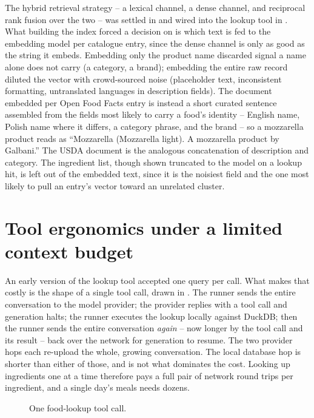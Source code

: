 The hybrid retrieval strategy -- a lexical channel, a dense channel, and reciprocal rank fusion over the two -- was settled in  and wired into the lookup tool in . What building the index forced a decision on is which text is fed to the embedding model per catalogue entry, since the dense channel is only as good as the string it embeds. Embedding only the product name discarded signal a name alone does not carry (a category, a brand); embedding the entire raw record diluted the vector with crowd-sourced noise (placeholder text, inconsistent formatting, untranslated languages in description fields). The document embedded per Open Food Facts entry is instead a short curated sentence assembled from the fields most likely to carry a food's identity -- English name, Polish name where it differs, a category phrase, and the brand -- so a mozzarella product reads as \enquote{Mozzarella (Mozzarella light). A mozzarella product by Galbani.} The USDA document is the analogous concatenation of description and category. The ingredient list, though shown truncated to the model on a lookup hit, is left out of the embedded text, since it is the noisiest field and the one most likely to pull an entry's vector toward an unrelated cluster.

\section{Tool ergonomics under a limited context budget}
\label{sec:impl-tool-ergonomics}

An early version of the lookup tool accepted one query per call. What makes that costly is the shape of a single tool call, drawn in . The runner sends the entire conversation to the model provider; the provider replies with a tool call and generation halts; the runner executes the lookup locally against DuckDB; then the runner sends the entire conversation \emph{again} -- now longer by the tool call and its result -- back over the network for generation to resume. The two provider hops each re-upload the whole, growing conversation. The local database hop is shorter than either of those, and is not what dominates the cost. Looking up ingredients one at a time therefore pays a full pair of network round trips per ingredient, and a single day's meals needs dozens.

\begin{figure}[htbp]
    \centering
    
    \caption{One food-lookup tool call.}
    \label{fig:diagram-tool-call-loop}
\end{figure}

